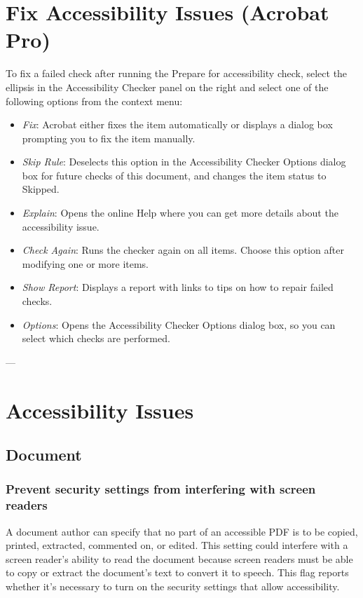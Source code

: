 \section{Fix Accessibility Issues (Acrobat Pro)}
To fix a failed check after running the Prepare for accessibility check, select the ellipsis in the Accessibility Checker panel on the right and select one of the following options from the context menu\cite{AdobeHelpX}:
\begin{itemize}
    \item \emph{Fix}: Acrobat either fixes the item automatically or displays a dialog box prompting you to fix the item manually.
    \item \emph{Skip Rule}: Deselects this option in the Accessibility Checker Options dialog box for future checks of this document, and changes the item status to Skipped.
    \item \emph{Explain}: Opens the online Help where you can get more details about the accessibility issue.
    \item \emph{Check Again}: Runs the checker again on all items. Choose this option after modifying one or more items.
    \item \emph{Show Report}: Displays a report with links to tips on how to repair failed checks.
    \item \emph{Options}: Opens the Accessibility Checker Options dialog box, so you can select which checks are performed.
\end{itemize}

---

\section{Accessibility Issues}

\subsection{Document}
\subsubsection{Prevent security settings from interfering with screen readers}
A document author can specify that no part of an accessible PDF is to be copied, printed, extracted, commented on, or edited. This setting could interfere with a screen reader's ability to read the document because screen readers must be able to copy or extract the document's text to convert it to speech. This flag reports whether it's necessary to turn on the security settings that allow accessibility\cite{AdobeHelpX}.

